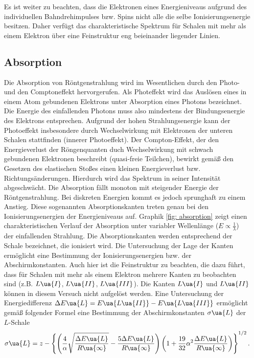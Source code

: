 Es ist weiter zu beachten, dass die Elektronen eines Energieniveaus
aufgrund des individuellen Bahndrehimpulses bzw. Spins nicht alle die selbe Ionisierungsenergie besitzen. Daher verfügt das charakteristische
Spektrum für Schalen mit mehr als einem Elektron über eine Feinstruktur eng beieinander liegender Linien.

\subsection{Absorption}
Die Absorption von Röntgenstrahlung wird im Wesentlichen durch den Photo- und den Comptoneffekt hervorgerufen.
Als Photeffekt wird das Auslösen eines in einem Atom gebundenen Elektrons unter Absorption eines Photons bezeichnet. Die
Energie des einfallenden Photons muss also mindestens der Bindungsenergie des Elektrons entsprechen.
Aufgrund der hohen Strahlungsenergie kann der Photoeffekt insbesondere durch Wechselwirkung mit Elektronen der unteren
Schalen stattfinden (innerer Photoeffekt). Der Compton-Effekt, der den Energieverlust der Röngenquanten duch Wechselwirkung
mit schwach gebundenen Elektronen beschreibt (quasi-freie Teilchen), bewirkt gemäß den Gesetzen des elastischen Stoßes
einen kleinen Energieverlust bzw. Richtungsänderungen.
Hierdurch wird das Spektrum in seiner Intensität abgeschwächt.
Die Absorption
fällt monoton mit steigender Energie der Röntgenstrahlung. Bei diskreten Energien kommt es jedoch sprunghaft zu einem Anstieg. Diese
sogenannten Absorptionskanten treten genau bei den Ionisierungsenergien der Energieniveaus auf.
Graphik \ref{fig: absorption} zeigt einen charakteristischen
Verlauf der Absorption unter variabler Wellenlänge ($E \propto \frac{1}{\lambda}$) der einfallenden Strahlung.
Die Absorptionskanten werden entsprechend der Schale bezeichnet, die ionisiert wird. Die Untersuchung der Lage der Kanten
ermöglicht eine Bestimmung der Ionisierungsenergien bzw. der Abschirmkonstanten.
Auch hier ist die Feinstruktur zu beachten, die dazu
führt, dass für Schalen mit mehr als einem Elektron mehrere Kanten zu beobachten sind (z.B. $L\ua{I}$, $L\ua{II}$, $L\ua{III}$).
Die Kanten $L\ua{I}$ und $L\ua{II}$ können in diesem Versuch nicht aufgelöst werden. Eine Untersuchung der Energiedifferenz
$\Delta E\ua{L} = E\ua{L\ua{II}} - E\ua{L\ua{III}}$ ermöglicht gemäß folgender Formel eine Bestimmung der Abschirmkonstanten
$\sigma\ua{L}$ der $L$-Schale
\begin{equation}
  \sigma\ua{L} = z - \left\{ \left(\frac{4}{\alpha}\sqrt{\frac{\Delta E\ua{L}}{R\ua{\infty}}} -\frac{5\Delta E\ua{L}}{R\ua{\infty}} \right)
  \left(1 + \frac{19}{32}\alpha^2\frac{\Delta E\ua{L}}{R\ua{\infty}} \right)  \right\}^{1/2}.
  \label{eq: sigma_L}
\end{equation}
